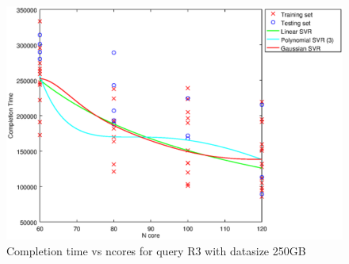 
\begin {figure}[hbtp]
\centering
\includegraphics[width=\textwidth]{output/R3_250_ONLY_1_OVER_NCORES/plot_R3_250_bestmodels.eps}
\caption{Completion time vs ncores for query R3 with datasize 250GB}
\label{fig:all_nonlinear_R3_250}
\end {figure}
